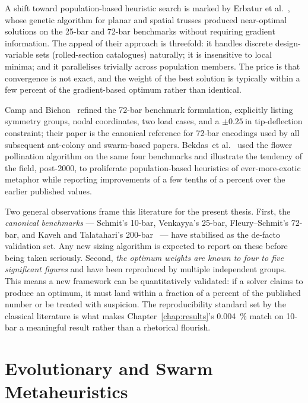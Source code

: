 A shift toward population-based heuristic search is marked by
Erbatur et al.~\cite{erbatur2000}, whose genetic algorithm for
planar and spatial trusses produced near-optimal solutions on the
25-bar and 72-bar benchmarks without requiring gradient information.
The appeal of their approach is threefold: it handles discrete
design-variable sets (rolled-section catalogues) naturally; it is
insensitive to local minima; and it parallelises trivially across
population members. The price is that convergence is not exact,
and the weight of the best solution is typically within a few
percent of the gradient-based optimum rather than identical.

Camp and Bichon~\cite{camp2004} refined the 72-bar benchmark
formulation, explicitly listing symmetry groups, nodal
coordinates, two load cases, and a $\pm\num{0.25}~\mathrm{in}$
tip-deflection constraint; their paper is the canonical reference
for 72-bar encodings used by all subsequent ant-colony and
swarm-based papers. Bekdas\ et al.~\cite{bekdas2015} used the flower
pollination algorithm on the same four benchmarks and illustrate
the tendency of the field, post-\num{2000}, to proliferate
population-based heuristics of ever-more-exotic metaphor while
reporting improvements of a few tenths of a percent over the
earlier published values.

Two general observations frame this literature for the present
thesis. First, the \emph{canonical benchmarks} --- Schmit's 10-bar,
Venkayya's 25-bar, Fleury--Schmit's 72-bar, and Kaveh and
Talatahari's 200-bar~\cite{kaveh2010} --- have stabilised as the
de-facto validation set. Any new sizing algorithm is expected to
report on these before being taken seriously. Second, \emph{the
optimum weights are known to four to five significant figures} and
have been reproduced by multiple independent groups. This means a
new framework can be quantitatively validated: if a solver claims
to produce an optimum, it must land within a fraction of a percent
of the published number or be treated with suspicion. The
reproducibility standard set by the classical literature is what
makes Chapter~\ref{chap:results}'s \num{0.004}~\% match on 10-bar a
meaningful result rather than a rhetorical flourish.

\section{Evolutionary and Swarm Metaheuristics}
\label{sec:lit:metaheuristics}

